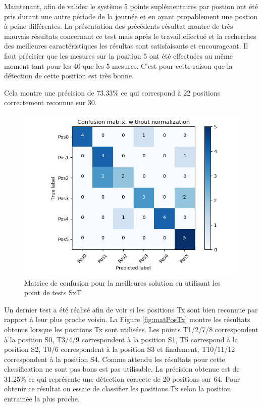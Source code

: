 Maintenant, afin de valider le système 5 points suplémentaires par postion ont été pris durant une autre période de la journée et en ayant propablement une postion à peine différentes. La présentation des précédents résultat montre de très mauvais résultats concernant ce test mais après le travail effectué et la recherches des meilleures caractéristiques les résultas sont satisfaisants et encourageant. Il faut précisier que les mesures sur la position 5 ont été effectuées au même moment tant pour les 40 que les 5 mesures. C'est pour cette raison que la détection de cette position est très bonne. 

Cela montre une précision de 73.33\% ce qui correspond à 22 positions correctement reconnue sur 30. 
\begin{figure}[htp]
	\begin{center}
		\includegraphics[scale=0.5]{figures/mat_pos_SxT.png}
		\caption{Matrice de confusion pour la meilleures solution en utilisant les point de tests SxT}
		\label{fig:matPosSxT} %
	\end{center}
\end{figure}

Un dernier test a été réalisé afin de voir si les positions Tx sont bien reconnue par rapport à leur plus proche voisin. La Figure \ref{fig:matPosTx} montre les résultats obtenus lorsque les positions Tx sont utilisées. Les points T1/2/7/8 correspondent à la position S0, T3/4/9 correspondent à la position S1, T5 correspond à la position S2, T0/6 correspondent à la position S3 et finalement, T10/11/12 correspondent à la position S4. Comme attendu les résultats pour cette classification ne sont pas bons est pas utilisable. La précision obtenue est de 31.25\% ce qui représente une détection correcte de 20 positions sur 64. Pour obtenir ce résultat on essaie de classifier les positions Tx selon la position entrainée la plus proche. 

